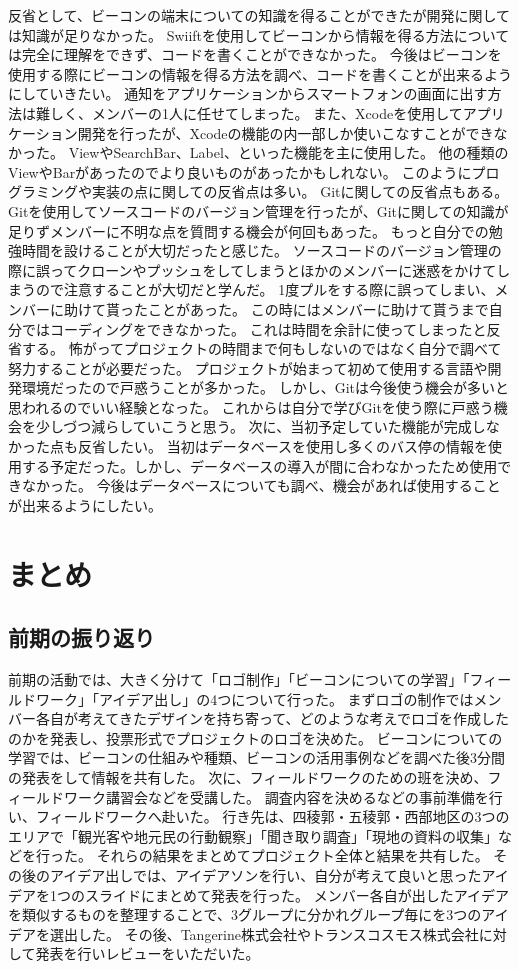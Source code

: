 \documentclass[openany,11pt,papersize]{jsbook}
\begin{document}
反省として、ビーコンの端末についての知識を得ることができたが開発に関しては知識が足りなかった。
Swiiftを使用してビーコンから情報を得る方法については完全に理解をできず、コードを書くことができなかった。
今後はビーコンを使用する際にビーコンの情報を得る方法を調べ、コードを書くことが出来るようにしていきたい。
通知をアプリケーションからスマートフォンの画面に出す方法は難しく、メンバーの1人に任せてしまった。
また、Xcodeを使用してアプリケーション開発を行ったが、Xcodeの機能の内一部しか使いこなすことができなかった。
ViewやSearchBar、Label、といった機能を主に使用した。
他の種類のViewやBarがあったのでより良いものがあったかもしれない。
このようにプログラミングや実装の点に関しての反省点は多い。
Gitに関しての反省点もある。
Gitを使用してソースコードのバージョン管理を行ったが、Gitに関しての知識が足りずメンバーに不明な点を質問する機会が何回もあった。
もっと自分での勉強時間を設けることが大切だったと感じた。
ソースコードのバージョン管理の際に誤ってクローンやプッシュをしてしまうとほかのメンバーに迷惑をかけてしまうので注意することが大切だと学んだ。
1度プルをする際に誤ってしまい、メンバーに助けて貰ったことがあった。
この時にはメンバーに助けて貰うまで自分ではコーディングをできなかった。
これは時間を余計に使ってしまったと反省する。
怖がってプロジェクトの時間まで何もしないのではなく自分で調べて努力することが必要だった。
プロジェクトが始まって初めて使用する言語や開発環境だったので戸惑うことが多かった。
しかし、Gitは今後使う機会が多いと思われるのでいい経験となった。
これからは自分で学びGitを使う際に戸惑う機会を少しづつ減らしていこうと思う。
次に、当初予定していた機能が完成しなかった点も反省したい。
当初はデータベースを使用し多くのバス停の情報を使用する予定だった。しかし、データベースの導入が間に合わなかったため使用できなかった。
今後はデータベースについても調べ、機会があれば使用することが出来るようにしたい。


\chapter{まとめ}
\section{前期の振り返り}
前期の活動では、大きく分けて「ロゴ制作」「ビーコンについての学習」「フィールドワーク」「アイデア出し」の4つについて行った。
まずロゴの制作ではメンバー各自が考えてきたデザインを持ち寄って、どのような考えでロゴを作成したのかを発表し、投票形式でプロジェクトのロゴを決めた。
ビーコンについての学習では、ビーコンの仕組みや種類、ビーコンの活用事例などを調べた後3分間の発表をして情報を共有した。
次に、フィールドワークのための班を決め、フィールドワーク講習会などを受講した。
調査内容を決めるなどの事前準備を行い、フィールドワークへ赴いた。
行き先は、四稜郭・五稜郭・西部地区の3つのエリアで「観光客や地元民の行動観察」「聞き取り調査」「現地の資料の収集」などを行った。
それらの結果をまとめてプロジェクト全体と結果を共有した。
その後のアイデア出しでは、アイデアソンを行い、自分が考えて良いと思ったアイデアを1つのスライドにまとめて発表を行った。
メンバー各自が出したアイデアを類似するものを整理することで、3グループに分かれグループ毎にを3つのアイデアを選出した。
その後、Tangerine株式会社やトランスコスモス株式会社に対して発表を行いレビューをいただいた。
\end{document}
